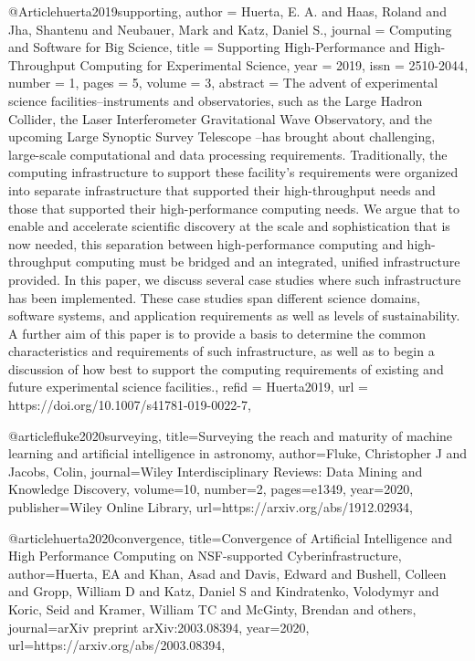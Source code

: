 @Article{huerta2019supporting,
  author   = {Huerta, E. A. and Haas, Roland and Jha, Shantenu and Neubauer, Mark and Katz, Daniel S.},
  journal  = {Computing and Software for Big Science},
  title    = {Supporting High-Performance and High-Throughput Computing for Experimental Science},
  year     = {2019},
  issn     = {2510-2044},
  number   = {1},
  pages    = {5},
  volume   = {3},
  abstract = {The advent of experimental science facilities--instruments and observatories, such as the Large Hadron Collider, the Laser Interferometer Gravitational Wave Observatory, and the upcoming Large Synoptic Survey Telescope --has brought about challenging, large-scale computational and data processing requirements. Traditionally, the computing infrastructure to support these facility’s requirements were organized into separate infrastructure that supported their high-throughput needs and those that supported their high-performance computing needs. We argue that to enable and accelerate scientific discovery at the scale and sophistication that is now needed, this separation between high-performance computing and high-throughput computing must be bridged and an integrated, unified infrastructure provided. In this paper, we discuss several case studies where such infrastructure has been implemented. These case studies span different science domains, software systems, and application requirements as well as levels of sustainability. A further aim of this paper is to provide a basis to determine the common characteristics and requirements of such infrastructure, as well as to begin a discussion of how best to support the computing requirements of existing and future experimental science facilities.},
  refid    = {Huerta2019},
  url      = {https://doi.org/10.1007/s41781-019-0022-7},
}

@article{fluke2020surveying,
  title={Surveying the reach and maturity of machine learning and artificial intelligence in astronomy},
  author={Fluke, Christopher J and Jacobs, Colin},
  journal={Wiley Interdisciplinary Reviews: Data Mining and Knowledge Discovery},
  volume={10},
  number={2},
  pages={e1349},
  year={2020},
  publisher={Wiley Online Library},
  url={https://arxiv.org/abs/1912.02934},
}

@article{huerta2020convergence,
  title={Convergence of Artificial Intelligence and High Performance Computing on NSF-supported Cyberinfrastructure},
  author={Huerta, EA and Khan, Asad and Davis, Edward and Bushell, Colleen and Gropp, William D and Katz, Daniel S and Kindratenko, Volodymyr and Koric, Seid and Kramer, William TC and McGinty, Brendan and others},
  journal={arXiv preprint arXiv:2003.08394},
  year={2020},
  url={https://arxiv.org/abs/2003.08394},
}

